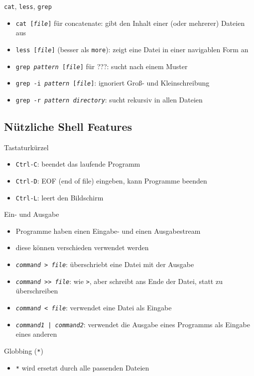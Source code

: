     \begin{frame}{\texttt{cat}, \texttt{less}, \texttt{grep}}
      \begin{itemize}
        \item \texttt{cat [\textit{file}]} für concatenate: gibt den Inhalt einer (oder mehrerer) Dateien aus
        \item \texttt{less [\textit{file}]} (besser als \texttt{more}): zeigt eine Datei in einer navigablen Form an
        \item \texttt{grep \textit{pattern} [\textit{file}]} für ???: sucht nach einem Muster
        \item \texttt{grep -i \textit{pattern} [\textit{file}]}: ignoriert Groß- und Kleinschreibung
        \item \texttt{grep -r \textit{pattern} \textit{directory}}: sucht rekursiv in allen Dateien
      \end{itemize}
    \end{frame}

  \subsection{Nützliche Shell Features}
    \begin{frame}{Tastaturkürzel}
      \begin{itemize}
        \item \texttt{Ctrl-C}: beendet das laufende Programm
        \item \texttt{Ctrl-D}: EOF (end of file) eingeben, kann Programme beenden
        \item \texttt{Ctrl-L}: leert den Bildschirm
      \end{itemize}
    \end{frame}

    \begin{frame}{Ein- und Ausgabe}
      \begin{itemize}
        \item Programme haben einen Eingabe- und einen Ausgabestream
        \item diese können verschieden verwendet werden
        \item \texttt{\textit{command} > \textit{file}}: überschriebt eine Datei mit der Ausgabe
        \item \texttt{\textit{command} >> \textit{file}}: wie \texttt{>}, aber schreibt ans Ende der Datei, statt zu überschreiben
        \item \texttt{\textit{command} < \textit{file}}: verwendet eine Datei als Eingabe
        \item \texttt{\textit{command1} | \textit{command2}}: verwendet die Ausgabe eines Programms als Eingabe eines anderen
      \end{itemize}
    \end{frame}

    \begin{frame}{Globbing (\texttt{*})}
      \begin{itemize}
        \item \texttt{*} wird ersetzt durch alle passenden Dateien
      \end{itemize}
    \end{frame}
